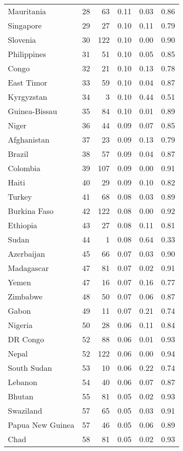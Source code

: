 \begin{longtable}[t]{lrrrrr}
Mauritania & 28 & 63 & 0.11 & 0.03 & 0.86\\
Singapore & 29 & 27 & 0.10 & 0.11 & 0.79\\
Slovenia & 30 & 122 & 0.10 & 0.00 & 0.90\\
\addlinespace
Philippines & 31 & 51 & 0.10 & 0.05 & 0.85\\
Congo & 32 & 21 & 0.10 & 0.13 & 0.78\\
East Timor & 33 & 59 & 0.10 & 0.04 & 0.87\\
Kyrgyzstan & 34 & 3 & 0.10 & 0.44 & 0.51\\
Guinea-Bissau & 35 & 84 & 0.10 & 0.01 & 0.89\\
\addlinespace
Niger & 36 & 44 & 0.09 & 0.07 & 0.85\\
Afghanistan & 37 & 23 & 0.09 & 0.13 & 0.79\\
Brazil & 38 & 57 & 0.09 & 0.04 & 0.87\\
Colombia & 39 & 107 & 0.09 & 0.00 & 0.91\\
Haiti & 40 & 29 & 0.09 & 0.10 & 0.82\\
\addlinespace
Turkey & 41 & 68 & 0.08 & 0.03 & 0.89\\
Burkina Faso & 42 & 122 & 0.08 & 0.00 & 0.92\\
Ethiopia & 43 & 27 & 0.08 & 0.11 & 0.81\\
Sudan & 44 & 1 & 0.08 & 0.64 & 0.33\\
Azerbaijan & 45 & 66 & 0.07 & 0.03 & 0.90\\
\addlinespace
Madagascar & 47 & 81 & 0.07 & 0.02 & 0.91\\
Yemen & 47 & 16 & 0.07 & 0.16 & 0.77\\
Zimbabwe & 48 & 50 & 0.07 & 0.06 & 0.87\\
Gabon & 49 & 11 & 0.07 & 0.21 & 0.74\\
Nigeria & 50 & 28 & 0.06 & 0.11 & 0.84\\
\addlinespace
DR Congo & 52 & 88 & 0.06 & 0.01 & 0.93\\
Nepal & 52 & 122 & 0.06 & 0.00 & 0.94\\
South Sudan & 53 & 10 & 0.06 & 0.22 & 0.74\\
Lebanon & 54 & 40 & 0.06 & 0.07 & 0.87\\
Bhutan & 55 & 81 & 0.05 & 0.02 & 0.93\\
\addlinespace
Swaziland & 57 & 65 & 0.05 & 0.03 & 0.91\\
Papua New Guinea & 57 & 46 & 0.05 & 0.06 & 0.89\\
Chad & 58 & 81 & 0.05 & 0.02 & 0.93\\

\end{longtable}
